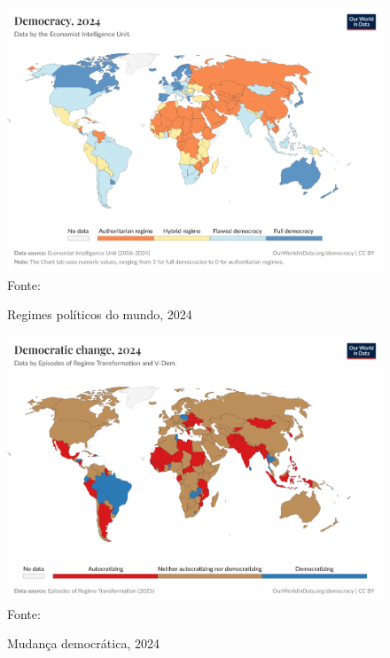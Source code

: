 \begin{figure}[ht]
    \centering
    \caption{Regimes políticos do mundo, 2024}
    \includegraphics[width=1\linewidth]{figuras/democracia/political-regime-eiu.png}
    \label{fig:political-regime-eiu}
    \footnotesize{Fonte: \cite{political_regime_eiu}}
\end{figure}

\begin{figure}[htbp]
    \centering
    \caption{Mudança democrática, 2024}
    \includegraphics[width=1\linewidth]{figuras/democracia/political-regime-ert.png}
    \label{fig:political-regime-ert}
    \footnotesize{Fonte: \cite{political_regime_ert}}
\end{figure}

